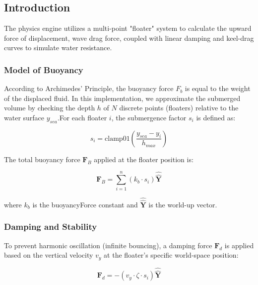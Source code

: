 \subsection{Introduction}

The physics engine utilizes a multi-point "floater" system to calculate the upward force of displacement, wave drag force, coupled with linear damping and keel-drag curves to simulate water resistance.







\subsubsection{Model of Buoyancy}
According to Archimedes' Principle, the buoyancy force $F_b$ is equal to the weight of the displaced fluid. In this implementation, we approximate the submerged volume by checking the depth $h$ of $N$ discrete points (floaters) relative to the water surface $y_{sea}$.For each floater $i$, the submergence factor $s_i$ is defined as:

\begin{equation}
s_i = \text{clamp01}\left(\frac{y_{sea} - y_i}{h_{max}}\right)
\label{equation:submergence_equation}
\end{equation}

The total buoyancy force $\mathbf{F}_B$ applied at the floater position is:


\begin{equation}
\mathbf{F}_B = \sum_{i=1}^{n} (k_b \cdot s_i) \hat{\mathbf{\hat{Y}}}
\end{equation}

where $k_b$ is the buoyancyForce constant and $\hat{\mathbf{\hat{Y}}}$ is the world-up vector.







\subsubsection{Damping and Stability}
To prevent harmonic oscillation (infinite bouncing), a damping force $\mathbf{F}_d$ is applied based on the vertical velocity $v_y$ at the floater's specific world-space position:

\begin{equation}
\mathbf{F}_d = -(v_y \cdot \zeta \cdot s_i) \hat{\mathbf{\hat{Y}}}
\end{equation}

